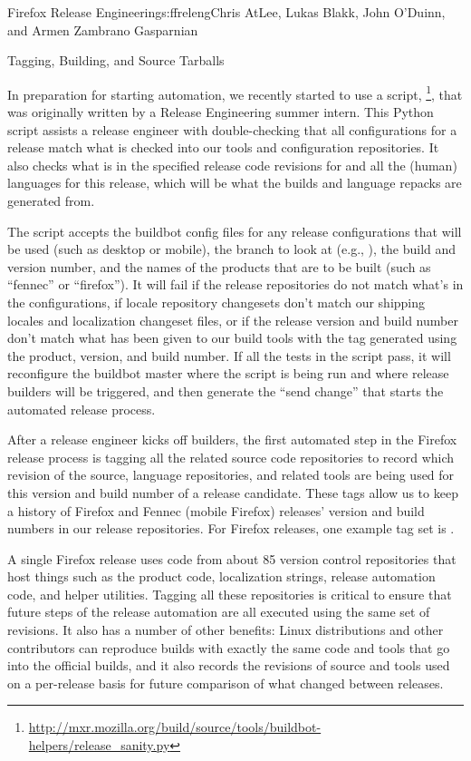 \begin{aosachapter}{Firefox Release Engineering}{s:ffreleng}{Chris AtLee, Lukas Blakk, John O'Duinn, and Armen Zambrano Gasparnian}
\begin{aosasect1}{Tagging, Building, and Source Tarballs}

    
In preparation for starting automation, we recently started to use a
script,
\footnote{\url{http://mxr.mozilla.org/build/source/tools/buildbot-helpers/release_sanity.py}},
that was originally written by a Release Engineering summer intern. This
Python script assists a release engineer with double-checking that all
configurations for a release match what is checked into our tools and
configuration repositories.  It also checks what is in the specified release
code revisions for  and all the (human)
languages for this release, which will be what the builds and language
repacks are generated from.

The script accepts the buildbot config files for any release configurations
that will be used (such as desktop or mobile), the branch to look at (e.g.,
), the build and version number, and the names of the
products that are to be built (such as ``fennec'' or ``firefox''). It will fail if
the release repositories do not
match what's in the configurations, if locale repository changesets don't
match our shipping locales and localization changeset files, or if the
release version and build number don't match what has been given to
our build tools with the tag generated using the product,
version, and build number. If all
the tests in the script pass, it will reconfigure the
buildbot master where the script is being run and where release
builders will be triggered, and then generate the ``send change'' that
starts the automated release process.

After a release engineer kicks off builders,
the first automated step in the Firefox release process is tagging all
the related source code repositories to record which revision of
the source, language repositories, and related tools are being used for this
version and build number of a release candidate. 
These tags allow us
to keep a history of Firefox and Fennec (mobile Firefox) releases'
version and build numbers in our release repositories.
For Firefox releases, one example tag set is
.  

A single Firefox
release uses code from about 85 version control repositories that host
things such as the product code, localization strings, release
automation code, and helper utilities. Tagging all these repositories
is critical to ensure that future steps of the release
automation are all executed using the same set of revisions. It also has a
number of other benefits: Linux distributions and other contributors
can reproduce builds with exactly the same code and tools that go into the
official builds, and it also records the revisions of source and tools
used on a per-release basis for future comparison of what changed
between releases. 
    

\end{aosasect1}
\end{aosachapter}
